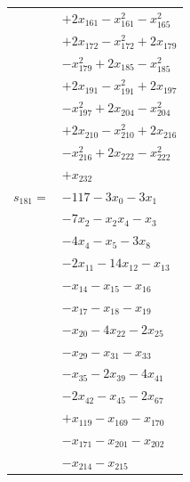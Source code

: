 \begin{longtable}{@{}r@{\;}l@{}}
 & \(\displaystyle +2x_{161} -x_{161}^{2} -x_{165}^{2}\) \\
 & \(\displaystyle +2x_{172} -x_{172}^{2} +2x_{179}\) \\
 & \(\displaystyle -x_{179}^{2} +2x_{185} -x_{185}^{2}\) \\
 & \(\displaystyle +2x_{191} -x_{191}^{2} +2x_{197}\) \\
 & \(\displaystyle -x_{197}^{2} +2x_{204} -x_{204}^{2}\) \\
 & \(\displaystyle +2x_{210} -x_{210}^{2} +2x_{216}\) \\
 & \(\displaystyle -x_{216}^{2} +2x_{222} -x_{222}^{2}\) \\
 & \(\displaystyle +x_{232}\) \\[3pt]
\(s_{181}=\) & \(\displaystyle -117 -3x_{0} -3x_{1}\) \\
 & \(\displaystyle -7x_{2} -x_{2}x_{4} -x_{3}\) \\
 & \(\displaystyle -4x_{4} -x_{5} -3x_{8}\) \\
 & \(\displaystyle -2x_{11} -14x_{12} -x_{13}\) \\
 & \(\displaystyle -x_{14} -x_{15} -x_{16}\) \\
 & \(\displaystyle -x_{17} -x_{18} -x_{19}\) \\
 & \(\displaystyle -x_{20} -4x_{22} -2x_{25}\) \\
 & \(\displaystyle -x_{29} -x_{31} -x_{33}\) \\
 & \(\displaystyle -x_{35} -2x_{39} -4x_{41}\) \\
 & \(\displaystyle -2x_{42} -x_{45} -2x_{67}\) \\
 & \(\displaystyle +x_{119} -x_{169} -x_{170}\) \\
 & \(\displaystyle -x_{171} -x_{201} -x_{202}\) \\
 & \(\displaystyle -x_{214} -x_{215}\) \\[3pt]
\end{longtable}
\endgroup
